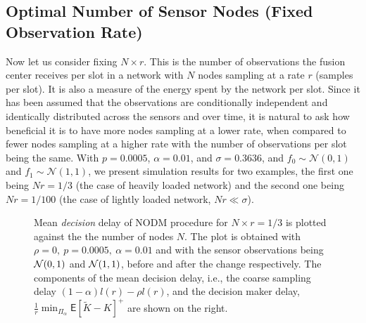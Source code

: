 \documentclass[acmtosn]{acmtrans2m}
\newcommand{\EXP}[1]{\mathsf{E}\!\left[#1\right]}
\begin{document}
\subsection{Optimal Number of Sensor Nodes (Fixed Observation Rate)}


Now let us consider fixing $N\times r$. This is the number of observations the 
fusion center receives per slot in a network with $N$ nodes sampling at a rate 
$r$ (samples per slot). It is also a measure of the energy spent by the network 
per slot. Since it has been assumed that the observations are conditionally 
independent and identically distributed across the sensors and over time, it is 
natural to ask how beneficial it is to have more nodes sampling at a lower rate, 
when compared to fewer nodes sampling at a higher rate with the number of 
observations per slot being the same. With $p=0.0005$, $\alpha=0.01$, and
$\sigma=0.3636$, and $f_0\sim\mathcal{N}(0,1)$ and $f_1\sim\mathcal{N}(1,1)$, we 
present simulation results for two examples, the first one being $Nr = 1/3$ (the 
case of heavily loaded network) and the second one being $Nr = 1/100$ (the case 
of lightly loaded network, $Nr \ll \sigma$).


\begin{figure}[t]
   \begin{center}
   \begin{minipage}{3.8cm}
   \begin{center}
   \end{center}
   \end{minipage}
\hspace{25mm}
   \begin{minipage}{3.8cm}
   \begin{center}
   \end{center}
   \end{minipage}
  \caption{Mean \emph{decision} delay of {\sf NODM} procedure for $N\times r=1/3$ is plotted
    against the the number of nodes $N$. The plot is obtained with 
    $\rho=0,~p=0.0005,~\alpha=0.01$ and with the sensor observations
    being ${\cal{N}}(0,1)$ and ${\cal{N}}(1,1)$, before and after the
    change respectively. The components of the mean decision delay, i.e., the coarse sampling delay 
    $(1-\alpha)l(r) - \rho l(r)$, and the
    decision maker delay, $\frac{1}{r}\min_{\Pi_\alpha} \EXP{\widetilde{K}-K}^+$ are shown on the right.}
  \label{fig:decision-delay}
  \end{center}
 \end{figure}
\end{document}
